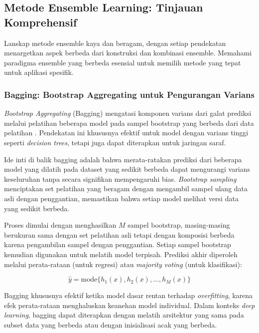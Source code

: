 \subsection{Metode Ensemble Learning: Tinjauan Komprehensif}

Lanskap metode ensemble kaya dan beragam, dengan setiap pendekatan menargetkan aspek berbeda dari konstruksi dan kombinasi ensemble. Memahami paradigma ensemble yang berbeda esensial untuk memilih metode yang tepat untuk aplikasi spesifik.

\subsubsection{Bagging: Bootstrap Aggregating untuk Pengurangan Varians}

\textit{Bootstrap Aggregating} (Bagging) mengatasi komponen varians dari galat prediksi melalui pelatihan beberapa model pada sampel bootstrap yang berbeda dari data pelatihan \cite{breiman1996bagging}. Pendekatan ini khususnya efektif untuk model dengan varians tinggi seperti \textit{decision trees}, tetapi juga dapat diterapkan untuk jaringan saraf.

Ide inti di balik bagging adalah bahwa merata-ratakan prediksi dari beberapa model yang dilatih pada dataset yang sedikit berbeda dapat mengurangi varians keseluruhan tanpa secara signifikan mempengaruhi bias. \textit{Bootstrap sampling} menciptakan set pelatihan yang beragam dengan mengambil sampel ulang data asli dengan penggantian, memastikan bahwa setiap model melihat versi data yang sedikit berbeda.

Proses dimulai dengan menghasilkan $M$ sampel bootstrap, masing-masing berukuran sama dengan set pelatihan asli tetapi dengan komposisi berbeda karena pengambilan sampel dengan penggantian. Setiap sampel bootstrap kemudian digunakan untuk melatih model terpisah. Prediksi akhir diperoleh melalui perata-rataan (untuk regresi) atau \textit{majority voting} (untuk klasifikasi):

\begin{equation}
\hat{y} = \text{mode}\{h_1(x), h_2(x), \ldots, h_M(x)\}
\label{eq:bagging_prediction}
\end{equation}

Bagging khususnya efektif ketika model dasar rentan terhadap \textit{overfitting}, karena efek perata-rataan menghaluskan keanehan model individual. Dalam konteks \textit{deep learning}, bagging dapat diterapkan dengan melatih arsitektur yang sama pada subset data yang berbeda atau dengan inisialisasi acak yang berbeda.

